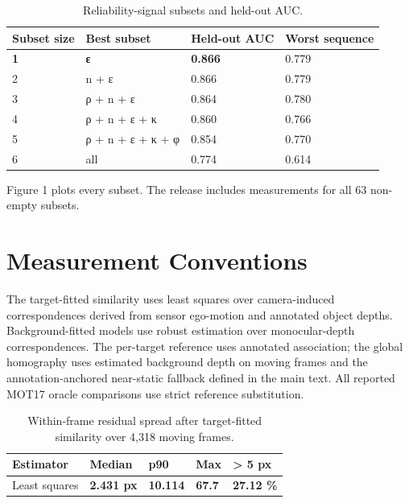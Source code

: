 \documentclass[sn-basic,Numbered]{sn-jnl}
\theoremstyle{thmstyleone}
\begin{document}
{\def\LTcaptype{none} %
\begin{table}[tp]
\centering
\caption{Reliability-signal subsets and held-out AUC.}\label{tab:1}
\fontsize{8.5}{10.5}\selectfont
\setlength{\tabcolsep}{3pt}
\renewcommand{\arraystretch}{1.12}
\begin{tabular*}{\textwidth}{@{\extracolsep{\fill}}llll@{}}
\toprule
Subset size & Best subset & Held-out AUC & Worst sequence \\
\midrule

\bottomrule

\textbf{1} & \textbf{ε} & \textbf{0.866} & 0.779 \\
2 & n + ε & 0.866 & 0.779 \\
3 & ρ + n + ε & 0.864 & 0.780 \\
4 & ρ + n + ε + κ & 0.860 & 0.766 \\
5 & ρ + n + ε + κ + φ & 0.854 & 0.770 \\
6 & all & 0.774 & 0.614 \\
\end{tabular*}
\end{table}

}

Figure 1 plots every subset. The release includes measurements for all 63 non-empty subsets.

\section{Measurement Conventions}\label{measurement-conventions}

The target-fitted similarity uses least squares over camera-induced correspondences derived from sensor ego-motion and annotated object depths. Background-fitted models use robust estimation over monocular-depth correspondences. The per-target reference uses annotated association; the global homography uses estimated background depth on moving frames and the annotation-anchored near-static fallback defined in the main text. All reported MOT17 oracle comparisons use strict reference substitution.


{\def\LTcaptype{none} %
\begin{table}[tp]
\centering
\caption{Within-frame residual spread after target-fitted similarity over 4,318 moving frames.}\label{tab:2}
\fontsize{8.5}{10.5}\selectfont
\setlength{\tabcolsep}{3pt}
\renewcommand{\arraystretch}{1.12}
\begin{tabularx}{\columnwidth}{@{}>{\raggedright\arraybackslash}Xllll@{}}
\toprule
Estimator & Median & p90 & Max & \textgreater{} 5 px \\
\midrule

\bottomrule

Least squares & \textbf{2.431 px} & \textbf{10.114} & \textbf{67.7} & \textbf{27.12 \%} \\
\end{tabularx}
\end{table}

}
\end{document}
